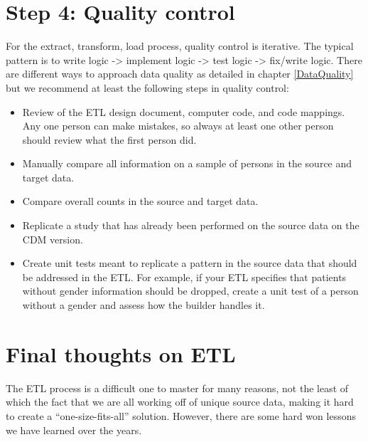 \documentclass[11pt]{book}
\providecommand{\tightlist}{%
  \setlength{\itemsep}{0pt}\setlength{\parskip}{0pt}}
\theoremstyle{definition}
\theoremstyle{definition}
\theoremstyle{definition}
\theoremstyle{remark}
\begin{document}
\hypertarget{step-4-quality-control}{%
\section{Step 4: Quality control}\label{step-4-quality-control}}

For the extract, transform, load process, quality control is iterative. The typical pattern is to write logic -\textgreater{} implement logic -\textgreater{} test logic -\textgreater{} fix/write logic. There are different ways to approach data quality as detailed in chapter \ref{DataQuality} but we recommend at least the following steps in quality control: 

\begin{itemize}
\tightlist
\item
  Review of the ETL design document, computer code, and code mappings. Any one person can make mistakes, so always at least one other person should review what the first person did.
\item
  Manually compare all information on a sample of persons in the source and target data.
\item
  Compare overall counts in the source and target data.
\item
  Replicate a study that has already been performed on the source data on the CDM version.
\item
  Create unit tests meant to replicate a pattern in the source data that should be addressed in the ETL. For example, if your ETL specifies that patients without gender information should be dropped, create a unit test of a person without a gender and assess how the builder handles it.
\end{itemize}

\hypertarget{final-thoughts-on-etl}{%
\section{Final thoughts on ETL}\label{final-thoughts-on-etl}}

The ETL process is a difficult one to master for many reasons, not the least of which the fact that we are all working off of unique source data, making it hard to create a ``one-size-fits-all'' solution. However, there are some hard won lessons we have learned over the years.
\end{document}
